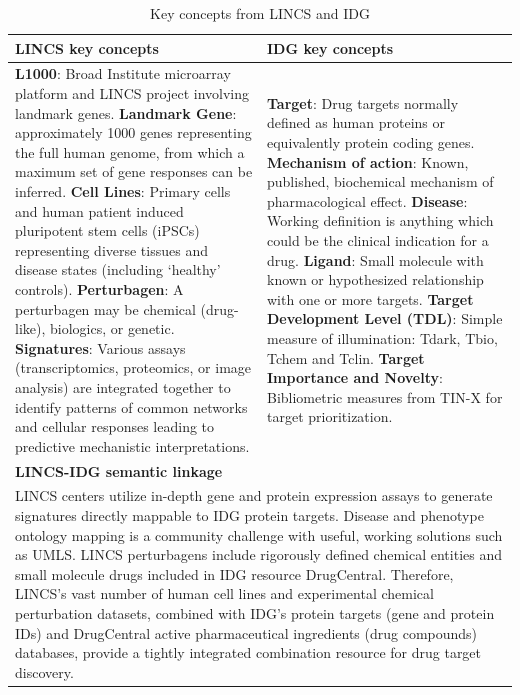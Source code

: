 \begin{table}
\caption{Key concepts from LINCS and IDG}
\begin{center}
\begin{tabular}{|p{0.5\linewidth}|p{0.5\linewidth}|}
\hline
\textbf{LINCS key concepts} & \textbf{IDG key concepts} \\
\hline
\textbf{L1000}: Broad Institute microarray platform and LINCS project involving landmark genes. \newline
\textbf{Landmark Gene}: approximately 1000 genes representing the full human genome, from which a maximum set of gene responses can be inferred.\newline
\textbf{Cell Lines}: Primary cells and human patient induced pluripotent stem cells (iPSCs) representing diverse tissues and disease states (including ‘healthy’ controls).\newline
\textbf{Perturbagen}: A perturbagen may be chemical (drug-like), biologics, or genetic.\newline
\textbf{Signatures}: Various assays (transcriptomics, proteomics, or image analysis) are integrated together to identify patterns of common networks and cellular responses leading to predictive mechanistic interpretations.
& 
\textbf{Target}: Drug targets normally defined as human proteins or equivalently protein coding genes.\newline
\textbf{Mechanism of action}: Known, published, biochemical mechanism of pharmacological effect.\newline
\textbf{Disease}: Working definition is anything which could be the clinical indication for a drug.\newline
\textbf{Ligand}: Small molecule with known or hypothesized relationship with one or more targets.\newline
\textbf{Target Development Level (TDL)}: Simple measure of illumination: Tdark, Tbio, Tchem and Tclin.\newline
\textbf{Target Importance and Novelty}: Bibliometric measures from TIN-X for target prioritization. \\
\hline
\multicolumn{2}{|p{1.0\linewidth}|}{\textbf{LINCS-IDG semantic linkage}} \\
\hline
\multicolumn{2}{|p{1.0\linewidth}|}{LINCS centers utilize in-depth gene and protein expression assays to generate signatures directly mappable to IDG protein targets. Disease and phenotype ontology mapping is a community challenge with useful, working solutions such as UMLS\cite{Bodenreider2004-gn}. LINCS perturbagens include rigorously defined chemical entities and small molecule drugs included in IDG resource DrugCentral. Therefore, LINCS’s vast number of human cell lines and experimental chemical perturbation datasets, combined with IDG’s protein targets (gene and protein IDs) and DrugCentral active pharmaceutical ingredients (drug compounds) databases, provide a tightly integrated combination resource for drug target discovery.} \\
\hline
\end{tabular}
\end{center}
\label{table:LINCS-IDG-Conc}
\end{table}


